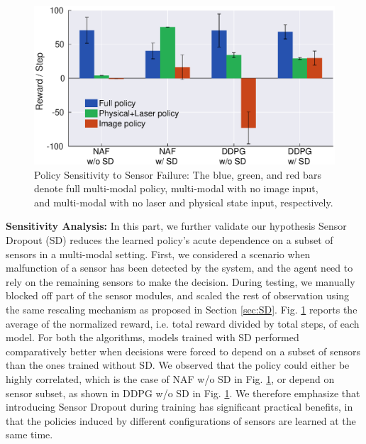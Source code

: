 \documentclass[../thesis.tex]{subfiles}
\begin{document}
\begin{figure}[t]
\begin{center}
\centerline{\includegraphics[width=0.9\columnwidth]{./MultimodalDRL/fig/policy}}
\caption{Policy Sensitivity to Sensor Failure: The blue, green, and red bars denote full multi-modal policy, multi-modal with no image input, and multi-modal with no laser and physical state input, respectively.}
\label{fig:policy_exp}
\end{center}
\end{figure} 

\textbf{Sensitivity Analysis:} \label{sec:policy}
In this part, we further validate our hypothesis Sensor Dropout (SD) reduces the learned policy's acute dependence on a subset of sensors in a multi-modal setting. First, we considered a scenario when malfunction of a sensor has been detected by the system, and the agent need to rely on the remaining sensors to make the decision. During testing, we manually blocked off part of the sensor modules, and scaled the rest of observation using the same rescaling mechanism as proposed in Section \ref{sec:SD}. Fig. \ref{fig:policy_exp} reports the average of the normalized reward, i.e. total reward divided by total steps, of each model. For both the algorithms, models trained with SD performed comparatively better when decisions were forced to depend on a subset of sensors than the ones trained without SD. We observed that the policy could either be highly correlated, which is the case of NAF w/o SD in Fig. \ref{fig:policy_exp}, or depend on sensor subset, as shown in DDPG w/o SD in Fig. \ref{fig:policy_exp}. We therefore emphasize that introducing Sensor Dropout during training has significant practical benefits, in that the policies induced by different configurations of sensors are learned at the same time. 
\end{document}
